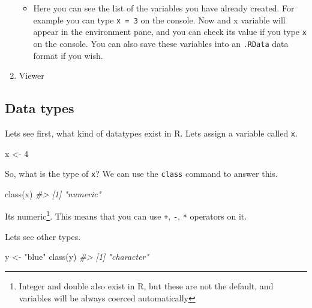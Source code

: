 \documentclass[
]{article}
\newenvironment{Shaded}{\begin{snugshade}}{\end{snugshade}}
\newcommand{\CommentTok}[1]{\textcolor[rgb]{0.56,0.35,0.01}{\textit{#1}}}
\newcommand{\DecValTok}[1]{\textcolor[rgb]{0.00,0.00,0.81}{#1}}
\newcommand{\FunctionTok}[1]{\textcolor[rgb]{0.00,0.00,0.00}{#1}}
\newcommand{\NormalTok}[1]{#1}
\newcommand{\OtherTok}[1]{\textcolor[rgb]{0.56,0.35,0.01}{#1}}
\newcommand{\StringTok}[1]{\textcolor[rgb]{0.31,0.60,0.02}{#1}}
\providecommand{\tightlist}{%
  \setlength{\itemsep}{0pt}\setlength{\parskip}{0pt}}
\begin{document}
\begin{enumerate}
  \begin{itemize}
  \tightlist
  \item
    Here you can see the list of the variables you have already created. For example you can type \texttt{x\ =\ 3} on the console. Now and x variable will appear in the environment pane, and you can check its value if you type \texttt{x} on the console. You can also save these variables into an \texttt{.RData} data format if you wish.
  \end{itemize}
\item
  Viewer
\end{enumerate}

\hypertarget{data-types}{%
\subsection{Data types}\label{data-types}}

Lets see first, what kind of datatypes exist in R. Lets assign a variable called \texttt{x}.

\begin{Shaded}
\begin{Highlighting}[]
\NormalTok{x }\OtherTok{\textless{}{-}} \DecValTok{4}
\end{Highlighting}
\end{Shaded}

So, what is the type of \texttt{x}? We can use the \texttt{class} command to answer this.

\begin{Shaded}
\begin{Highlighting}[]
\FunctionTok{class}\NormalTok{(x)}
\CommentTok{\#\textgreater{} [1] "numeric"}
\end{Highlighting}
\end{Shaded}

Its numeric\footnote{Integer and double also exist in R, but these are not the default, and variables will be always coerced automatically}. This means that you can use \texttt{+}, \texttt{-}, \texttt{*} operators on it.

Lets see other types.

\begin{Shaded}
\begin{Highlighting}[]
\NormalTok{y }\OtherTok{\textless{}{-}} \StringTok{"blue"}
\FunctionTok{class}\NormalTok{(y)}
\CommentTok{\#\textgreater{} [1] "character"}
\end{Highlighting}
\end{Shaded}
\end{document}

